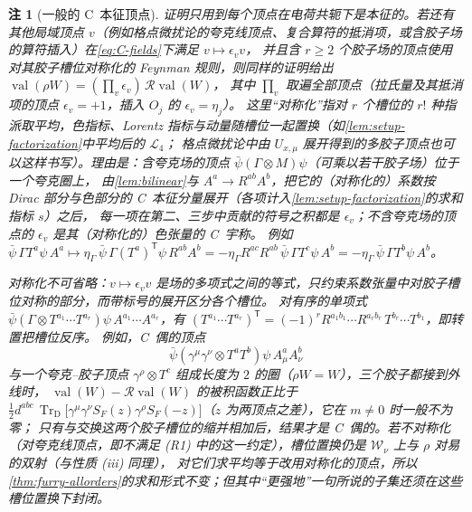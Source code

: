 \documentclass[UTF8,a4paper,11pt,fontset=fandol]{ctexart}
\theoremstyle{cplain}
\theoremstyle{cdefinition}
\theoremstyle{cremark}
\newtheorem{remark}[theorem]{注}
\numberwithin{equation}{section}
\newcommand{\TrD}{\operatorname{Tr}_{\mathrm{D}}}   %
\newcommand{\tp}{\mathsf{T}}                         %
\newcommand{\Rop}{\mathcal{R}}                       %
\newcommand{\SF}{S_{F}}                              %
\begin{document}
\begin{remark}[一般的 C~本征顶点]\label{rem:thmII-general-vertices}
证明只用到每个顶点在电荷共轭下是本征的。若还有其他局域顶点 $v$（例如格点微扰论的夸克线顶点、复合算符的抵消项，或含胶子场的算符插入）在\cref{eq:C-fields}下满足 $v\mapsto\epsilon_vv$，
并且含 $r\ge2$ 个胶子场的顶点使用对其胶子槽位对称化的 Feynman 规则，则同样的证明给出 $\operatorname{val}(\rho W)=(\prod_v\epsilon_v)\,\Rop\operatorname{val}(W)$，
其中 $\prod_v$ 取遍全部顶点（拉氏量及其抵消项的顶点 $\epsilon_v=+1$，插入 $O_j$ 的 $\epsilon_v=\eta_j$）。
这里“对称化”指对 $r$ 个槽位的 $r!$ 种指派取平均，色指标、Lorentz 指标与动量随槽位一起置换（如\cref{lem:setup-factorization}中平均后的 $\mathcal L_4$；
格点微扰论中由 $U_{x,\mu}$ 展开得到的多胶子顶点也可以这样书写）。理由是：含夸克场的顶点 $\bar\psi(\Gamma\otimes M)\psi$（可乘以若干胶子场）位于一个夸克圈上，
由\cref{lem:bilinear}与 $A^a\to R^{ab}A^b$，把它的（对称化的）系数按 Dirac 部分与色部分的 C~本征分量展开（各项计入\cref{lem:setup-factorization}的求和指标 $s$）之后，
每一项在第二、三步中贡献的符号之积都是 $\epsilon_v$；不含夸克场的顶点的 $\epsilon_v$ 是其（对称化的）色张量的 C~宇称。
例如 $\bar\psi\,\Gamma T^a\psi\,A^a\mapsto\eta_\Gamma\,\bar\psi\,\Gamma(T^a)^{\tp}\psi\,R^{ab}A^b=-\eta_\Gamma R^{ac}R^{ab}\,\bar\psi\,\Gamma T^c\psi\,A^b=-\eta_\Gamma\,\bar\psi\,\Gamma T^b\psi\,A^b$。

对称化不可省略：$v\mapsto\epsilon_vv$ 是场的多项式之间的等式，只约束系数张量中对胶子槽位对称的部分，而带标号的展开区分各个槽位。
对有序的单项式 $\bar\psi(\Gamma\otimes T^{a_1}\cdots T^{a_r})\psi\,A^{a_1}\cdots A^{a_r}$，有 $(T^{a_1}\cdots T^{a_r})^{\tp}=(-1)^rR^{a_1b_1}\cdots R^{a_rb_r}\,T^{b_r}\cdots T^{b_1}$，即转置把槽位反序。
例如，C~偶的顶点
\[
\bar\psi(\gamma^\mu\gamma^\nu\otimes T^aT^b)\psi\,A^a_\mu A^b_\nu
\]
与一个夸克--胶子顶点 $\gamma^\rho\otimes T^c$ 组成长度为 $2$ 的圈（$\rho W=W$），三个胶子都接到外线时，
$\operatorname{val}(W)-\Rop\operatorname{val}(W)$ 的被积函数正比于 $\frac12d^{abc}\,\TrD\bigl[\gamma^\mu\gamma^\nu\SF(z)\gamma^\rho\SF(-z)\bigr]$（$z$ 为两顶点之差），它在 $m\neq0$ 时一般不为零；
只有与交换这两个胶子槽位的缩并相加后，结果才是 C~偶的。若不对称化（对夸克线顶点，即不满足 (R1) 中的这一约定），槽位置换仍是 $\mathcal W_\nu$ 上与 $\rho$ 对易的双射（与性质 (iii) 同理），
对它们求平均等于改用对称化的顶点，所以\cref{thm:furry-allorders}的求和形式不变；但其中“更强地”一句所说的子集还须在这些槽位置换下封闭。
\end{remark}

\end{document}
